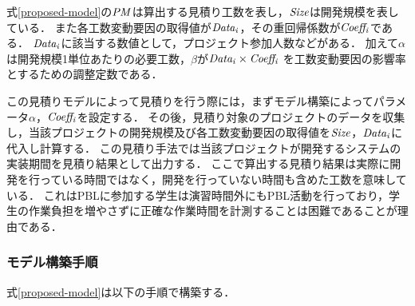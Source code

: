\documentclass{compsoft}
\begin{document}
式\ref{proposed-model}の${\it PM}$は算出する見積り工数を表し，${\it Size}$は開発規模を表している．
また各工数変動要因の取得値が${\it Data_{i} }$，その重回帰係数が${\it Coeff_{i}}$である．
${\it Data_{i} }$に該当する数値として，プロジェクト参加人数などがある．
加えて${\alpha }$は開発規模1単位あたりの必要工数，$ \beta $が$ {\it Data_{i}} \times {\it Coeff_{i}}$ を工数変動要因の影響率とするための調整定数である．

この見積りモデルによって見積りを行う際には，まずモデル構築によってパラメータ$ \alpha $，$ {\it Coeff_{i}} $を設定する．
その後，見積り対象のプロジェクトのデータを収集し，当該プロジェクトの開発規模及び各工数変動要因の取得値を$ {\it Size} $，$ {\it Data_{i}} $に代入し計算する．
この見積り手法では当該プロジェクトが開発するシステムの実装期間を見積り結果として出力する．
ここで算出する見積り結果は実際に開発を行っている時間ではなく，開発を行っていない時間も含めた工数を意味している．
これはPBLに参加する学生は演習時間外にもPBL活動を行っており，学生の作業負担を増やさずに正確な作業時間を計測することは困難であることが理由である．

\subsubsection{モデル構築手順} \label{model-const}
式\ref{proposed-model}は以下の手順で構築する．
\end{document}
